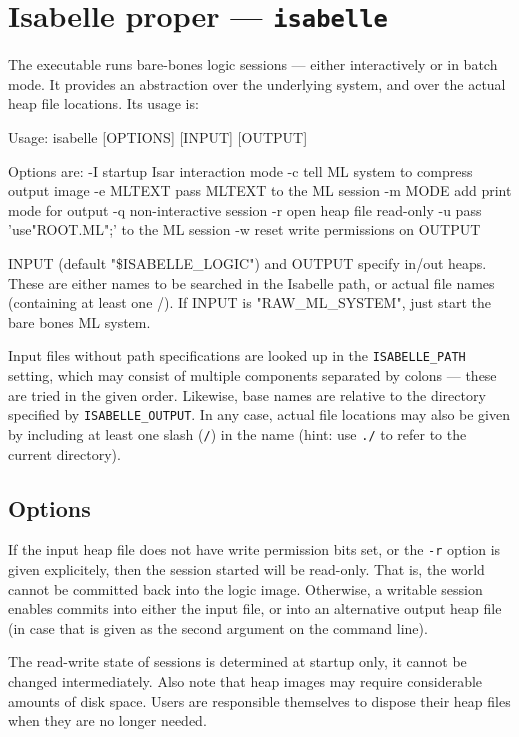 \section{Isabelle proper --- \texttt{isabelle}}

The  executable runs bare-bones logic sessions --- either
interactively or in batch mode. It provides an abstraction over the underlying
{\ML} system, and over the actual heap file locations. Its usage is:
\begin{ttbox}
Usage: isabelle [OPTIONS] [INPUT] [OUTPUT]

  Options are:
    -I           startup Isar interaction mode
    -c           tell ML system to compress output image
    -e MLTEXT    pass MLTEXT to the ML session
    -m MODE      add print mode for output
    -q           non-interactive session
    -r           open heap file read-only
    -u           pass 'use"ROOT.ML";' to the ML session
    -w           reset write permissions on OUTPUT

  INPUT (default "\$ISABELLE_LOGIC") and OUTPUT specify in/out heaps.
  These are either names to be searched in the Isabelle path, or
  actual file names (containing at least one /).
  If INPUT is "RAW_ML_SYSTEM", just start the bare bones ML system.
\end{ttbox}
Input files without path specifications are looked up in the
\texttt{ISABELLE_PATH} setting, which may consist of multiple components
separated by colons --- these are tried in the given order.  Likewise, base
names are relative to the directory specified by \texttt{ISABELLE_OUTPUT}.  In
any case, actual file locations may also be given by including at least one
slash (\texttt{/}) in the name (hint: use \texttt{./} to refer to the current
directory).


\subsection*{Options}

If the input heap file does not have write permission bits set, or the
\texttt{-r} option is given explicitely, then the session started will be
read-only.  That is, the {\ML} world cannot be committed back into the logic
image.  Otherwise, a writable session enables commits into either the input
file, or into an alternative output heap file (in case that is given as the
second argument on the command line).

The read-write state of sessions is determined at startup only, it cannot be
changed intermediately. Also note that heap images may require considerable
amounts of disk space. Users are responsible themselves to dispose their heap
files when they are no longer needed.

